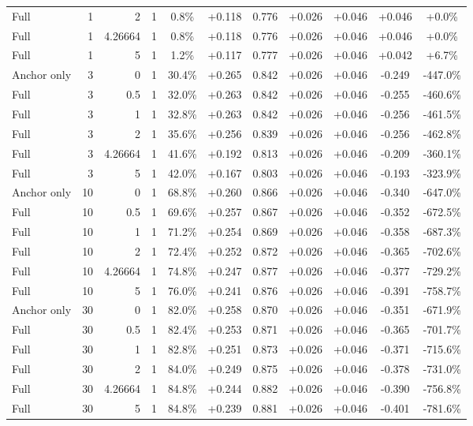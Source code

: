 \begin{table}[htbp]
\begin{tabular}{lrrrccccccc}
Full & 1 & 2 & 1 & 0.8\% & +0.118 & 0.776 & +0.026 & +0.046 & +0.046 & +0.0\% \\
Full & 1 & 4.26664 & 1 & 0.8\% & +0.118 & 0.776 & +0.026 & +0.046 & +0.046 & +0.0\% \\
Full & 1 & 5 & 1 & 1.2\% & +0.117 & 0.777 & +0.026 & +0.046 & +0.042 & +6.7\% \\
Anchor only & 3 & 0 & 1 & 30.4\% & +0.265 & 0.842 & +0.026 & +0.046 & -0.249 & -447.0\% \\
Full & 3 & 0.5 & 1 & 32.0\% & +0.263 & 0.842 & +0.026 & +0.046 & -0.255 & -460.6\% \\
Full & 3 & 1 & 1 & 32.8\% & +0.263 & 0.842 & +0.026 & +0.046 & -0.256 & -461.5\% \\
Full & 3 & 2 & 1 & 35.6\% & +0.256 & 0.839 & +0.026 & +0.046 & -0.256 & -462.8\% \\
Full & 3 & 4.26664 & 1 & 41.6\% & +0.192 & 0.813 & +0.026 & +0.046 & -0.209 & -360.1\% \\
Full & 3 & 5 & 1 & 42.0\% & +0.167 & 0.803 & +0.026 & +0.046 & -0.193 & -323.9\% \\
Anchor only & 10 & 0 & 1 & 68.8\% & +0.260 & 0.866 & +0.026 & +0.046 & -0.340 & -647.0\% \\
Full & 10 & 0.5 & 1 & 69.6\% & +0.257 & 0.867 & +0.026 & +0.046 & -0.352 & -672.5\% \\
Full & 10 & 1 & 1 & 71.2\% & +0.254 & 0.869 & +0.026 & +0.046 & -0.358 & -687.3\% \\
Full & 10 & 2 & 1 & 72.4\% & +0.252 & 0.872 & +0.026 & +0.046 & -0.365 & -702.6\% \\
Full & 10 & 4.26664 & 1 & 74.8\% & +0.247 & 0.877 & +0.026 & +0.046 & -0.377 & -729.2\% \\
Full & 10 & 5 & 1 & 76.0\% & +0.241 & 0.876 & +0.026 & +0.046 & -0.391 & -758.7\% \\
Anchor only & 30 & 0 & 1 & 82.0\% & +0.258 & 0.870 & +0.026 & +0.046 & -0.351 & -671.9\% \\
Full & 30 & 0.5 & 1 & 82.4\% & +0.253 & 0.871 & +0.026 & +0.046 & -0.365 & -701.7\% \\
Full & 30 & 1 & 1 & 82.8\% & +0.251 & 0.873 & +0.026 & +0.046 & -0.371 & -715.6\% \\
Full & 30 & 2 & 1 & 84.0\% & +0.249 & 0.875 & +0.026 & +0.046 & -0.378 & -731.0\% \\
Full & 30 & 4.26664 & 1 & 84.8\% & +0.244 & 0.882 & +0.026 & +0.046 & -0.390 & -756.8\% \\
Full & 30 & 5 & 1 & 84.8\% & +0.239 & 0.881 & +0.026 & +0.046 & -0.401 & -781.6\% \\

\end{tabular}
\end{table}
